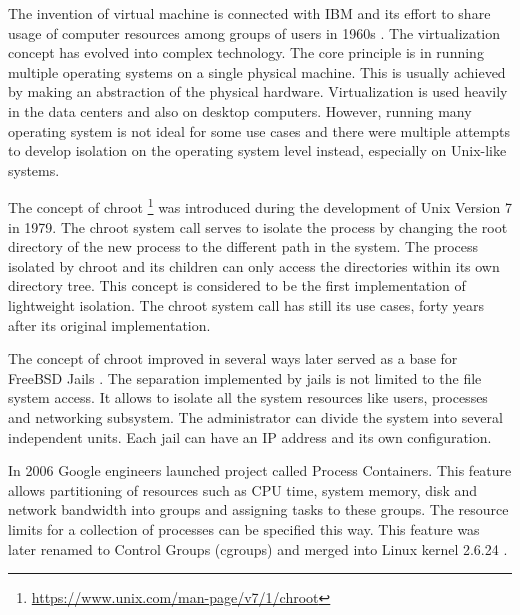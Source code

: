 \documentclass[
  digital, %
  twoside, %
  table,   %
  lof,     %
  lot,     %
]{fithesis3}
\begin{document}
The invention of virtual machine is connected with IBM and its effort to share usage of computer resources among groups of users in 1960s \cite{vm_history}. The virtualization concept has evolved into complex technology. The core principle is in running multiple operating systems on a single physical machine. This is usually achieved by making an abstraction of the physical hardware. Virtualization is used heavily in the data centers and also on desktop computers. However, running many operating system is not ideal for some use cases and there were multiple attempts to develop isolation on the operating system level instead, especially on Unix-like systems.

The concept of chroot \footnote{\url{https://www.unix.com/man-page/v7/1/chroot}} was introduced during the development of Unix Version 7 in 1979. The chroot system call serves to isolate the process by changing the root directory of the new process to the different path in the system. The process isolated by chroot and its children can only access the directories within its own directory tree. This concept is considered to be the first implementation of lightweight isolation. The chroot system call has still its use cases, forty years after its original implementation.

The concept of chroot improved in several ways later served as a base for FreeBSD Jails \cite{freebsd_jails}. The separation implemented by jails is not limited to the file system access. It allows to isolate all the system resources like users, processes and networking subsystem. The administrator can divide the system into several independent units. Each jail can have an IP address and its own configuration.

In 2006 Google engineers launched project called Process Containers. This feature allows partitioning of resources such as CPU time, system memory, disk and network bandwidth into groups and assigning tasks to these groups. The resource limits for a collection of processes can be specified this way. This feature was later renamed to Control Groups (cgroups) and merged into Linux kernel 2.6.24 \cite{cgroups}.
\end{document}
